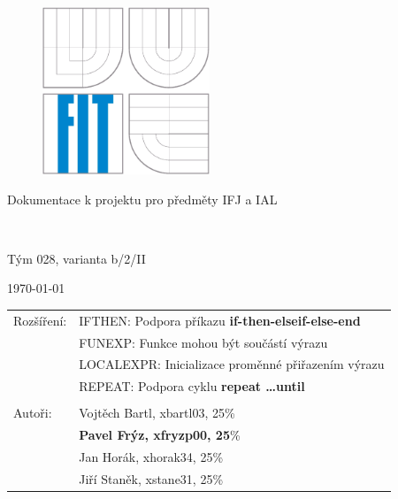 \begin{titlepage}

\begin{figure}[!h]
  \centering
  \includegraphics[height=5cm]{img/logo.eps}
\end{figure}

\vfill

\begin{center}
\begin{Large}
Dokumentace k projektu pro předměty IFJ a IAL\\
\end{Large}
\bigskip
\begin{LARGE}
\projname\\
\end{LARGE}
\begin{large}
Tým 028, varianta b/2/II
\end{large}
\end{center}

\vfill

\begin{center}
\begin{Large}
\today
\end{Large}
\end{center}

\vfill

\begin{flushleft}
\begin{large}
\begin{tabular}{ll}
Rozšíření: & IFTHEN: Podpora příkazu \textbf{if-then-elseif-else-end}\\
 & FUNEXP: Funkce mohou být součástí výrazu\\
 & LOCALEXPR: Inicializace proměnné přiřazením výrazu\\
 & REPEAT: Podpora cyklu \textbf{repeat \ldots until}\\
 &\\
Autoři: & Vojtěch Bartl, xbartl03, 25\% \\
 & \textbf{Pavel Frýz, xfryzp00, 25}\% \\
 & Jan Horák, xhorak34, 25\% \\
 & Jiří Staněk, xstane31, 25\% \\
\end{tabular}
\end{large}
\end{flushleft}
\end{titlepage}
